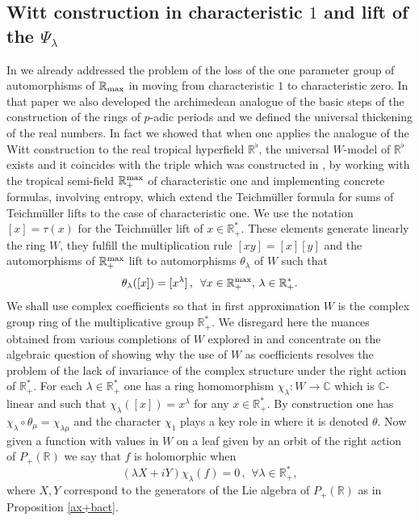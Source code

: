 \documentclass[graybox, envcountsect%
]{svmult}
\def\C{{\mathbb C}}
\def\R{{\mathbb R}}
\def\qqq{\,,\,~\forall}
\def\trop{{\R^\flat}}
\def\rma{\R_{\rm max}}
\def\rmax{\R_+^{\rm max}}
\def\trop{{\R^\flat}}
\begin{document}
\subsection{Witt construction in characteristic $1$ and lift of the $\Psi_\lambda$}\label{subsect:7.1}
  In \cite{ccthickening} we already addressed the problem of the loss of the one parameter group of automorphisms of $\rma$ in moving from characteristic $1$ to characteristic zero.  In that paper we also developed the archimedean analogue of the basic steps of the construction of the rings of $p$-adic periods and we defined the universal thickening of the real numbers. In fact we showed that  when one applies the analogue of the Witt construction to the real tropical hyperfield  $\trop$,
 the universal $W$-model of $\trop$ exists and it coincides with the triple which was constructed in \cite{CCentropy,Cwitt}, by working with the tropical semi-field $\rmax$ of characteristic one and implementing  concrete formulas, involving entropy, which extend the Teichm\"uller formula for sums of Teichm\"uller lifts to the case of characteristic one. We use the notation $[x]=\tau(x)$ for the Teichm\"uller lift of $x\in \R_+^*$. These elements generate linearly the ring $W$, they fulfill the multiplication rule $[xy]=[x][y]$ and the automorphisms of $\rmax$ lift to automorphisms $\theta_\lambda$ of $W$ such that 
 $$
 \theta_\lambda([x])=[x^\lambda] \qqq x\in \rmax, \, \lambda \in \R_+^*.
 $$
 We shall use complex coefficients so that in first approximation $W$ is the complex group ring of the multiplicative group $\R_+^*$. We disregard here the nuances obtained from various completions of $W$ explored in \cite{ccthickening} and concentrate on the algebraic question of showing why the use of $W$ as coefficients resolves the problem of the lack of invariance of the complex structure under the right action of $\R_+^*$. For each $\lambda \in \R_+^*$ one has a ring homomorphism $\chi_\lambda:W\to \C$ which is $\C$-linear and such that $\chi_\lambda([x])=x^\lambda$ for any $x\in \R_+^*$. By construction one has $\chi_\lambda\circ \theta_\mu=\chi_{\lambda\mu}$ and the character $\chi_1$ plays a key role in  \cite{ccthickening} where it is denoted $\theta$. Now given a function with values in $W$ on  a leaf given by  an orbit of the right action of  $P_+(\R)$ we say that $f$ is holomorphic when 
 \begin{equation}\label{holom}
 \left(\lambda X+i Y\right) 	\chi_\lambda(f)=0 \qqq \lambda \in \R_+^*,
 \end{equation}
 where $X,Y$ correspond to the generators of the Lie algebra of  $P_+(\R)$ as in Proposition \ref{ax+bact}. 
\end{document}
